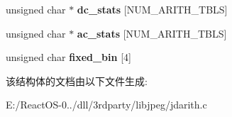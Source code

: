 \begin{DoxyCompactItemize}
\item 
\mbox{\label{structarith__entropy__decoder_a0a8fd2a17e1e838e9194fab8579463d5}} 
unsigned char $\ast$ {\bfseries dc\+\_\+stats} \mbox{[}N\+U\+M\+\_\+\+A\+R\+I\+T\+H\+\_\+\+T\+B\+LS\mbox{]}
\item 
\mbox{\label{structarith__entropy__decoder_ad24b1d5f8dae5839bca9cc749bf9f06e}} 
unsigned char $\ast$ {\bfseries ac\+\_\+stats} \mbox{[}N\+U\+M\+\_\+\+A\+R\+I\+T\+H\+\_\+\+T\+B\+LS\mbox{]}
\item 
\mbox{\label{structarith__entropy__decoder_a3e88e1dc54dd33d41dd937a8dc03342a}} 
unsigned char {\bfseries fixed\+\_\+bin} \mbox{[}4\mbox{]}
\end{DoxyCompactItemize}


该结构体的文档由以下文件生成\+:\begin{DoxyCompactItemize}
\item 
E\+:/\+React\+O\+S-\/0../dll/3rdparty/libjpeg/jdarith.\+c\end{DoxyCompactItemize}
